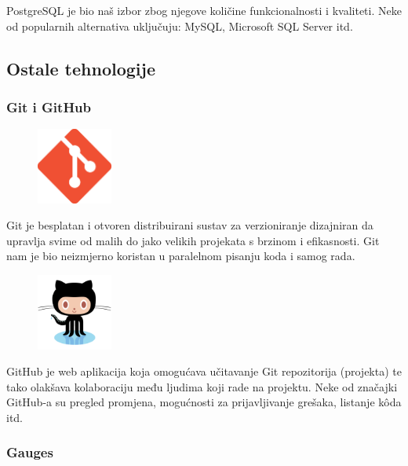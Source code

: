 \documentclass{scrreprt}
\begin{document}
PostgreSQL je bio naš izbor zbog njegove količine funkcionalnosti i kvaliteti.
Neke od popularnih alternativa uključuju: MySQL, Microsoft SQL Server itd.

\subsection{Ostale tehnologije}

\subsubsection{Git i GitHub}

\begin{figure}
  \vspace{-10pt}
  \includegraphics[width=2.5cm]{logos/git}
  \vspace{-30pt}
\end{figure}

Git je besplatan i otvoren distribuirani sustav za verzioniranje dizajniran da
upravlja svime od malih do jako velikih projekata s brzinom i
efikasnosti.\cite{git} Git nam je bio neizmjerno koristan u paralelnom pisanju
koda i samog rada.

\begin{figure}
  \vspace{-10pt}
  \includegraphics[width=2.5cm]{logos/github}
  \vspace{-30pt}
\end{figure}

GitHub je web aplikacija koja omogućava učitavanje Git repozitorija (projekta)
te tako olakšava kolaboraciju među ljudima koji rade na projektu.\cite{github}
Neke od značajki GitHub-a su pregled promjena, mogućnosti za prijavljivanje
grešaka, listanje kôda itd.

\subsubsection{Gauges}
\end{document}
